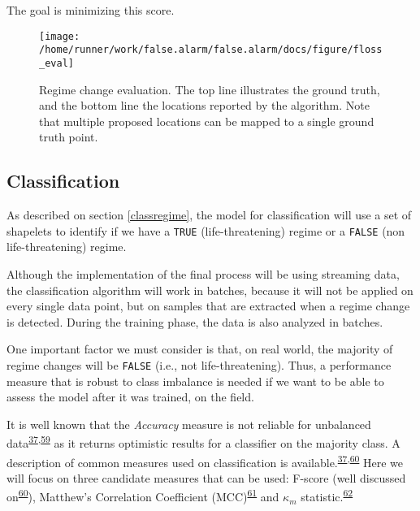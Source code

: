 \documentclass[12pt,twoside]{fmupthesis}
\begin{document}
The goal is minimizing this score.
\begin{figure}

{\centering \texttt{[image: /home/runner/work/false.alarm/false.alarm/docs/figure/floss\_eval]} 

}

\caption{Regime change evaluation. The top line illustrates the ground truth, and the bottom line the locations reported by the algorithm. Note that multiple proposed locations can be mapped to a single ground truth point.}\label{fig:flosseval}
\end{figure}
\hypertarget{classification}{%
\subsection{Classification}\label{classification}}

As described on section \ref{classregime}, the model for classification will use a set of shapelets
to identify if we have a \texttt{TRUE} (life-threatening) regime or a \texttt{FALSE} (non life-threatening) regime.

Although the implementation of the final process will be using streaming data, the classification
algorithm will work in batches, because it will not be applied on every single data point, but on
samples that are extracted when a regime change is detected. During the training phase, the data is
also analyzed in batches.

One important factor we must consider is that, on real world, the majority of regime changes will be
\texttt{FALSE} (i.e., not life-threatening). Thus, a performance measure that is robust to class imbalance
is needed if we want to be able to assess the model after it was trained, on the field.

It is well known that the \emph{Accuracy} measure is not reliable for unbalanced data\textsuperscript{\protect\hyperlink{ref-Akosa2017}{37},\protect\hyperlink{ref-Bekkar2013}{59}} as it returns optimistic results for a classifier on the majority class. A
description of common measures used on classification is available.\textsuperscript{\protect\hyperlink{ref-Akosa2017}{37},\protect\hyperlink{ref-Chicco2020}{60}} Here
we will focus on three candidate measures that can be used: F-score (well discussed on\textsuperscript{\protect\hyperlink{ref-Chicco2020}{60}}), Matthew's Correlation Coefficient (MCC)\textsuperscript{\protect\hyperlink{ref-Matthews1975}{61}} and \(\kappa_m\) statistic.\textsuperscript{\protect\hyperlink{ref-Bifet2015}{62}}
\end{document}
